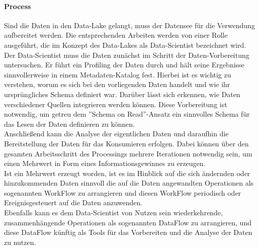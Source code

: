 \documentclass[twoside,twocolumn]{article}
\begin{document}
\paragraph{Process}
		Sind die Daten in den Data-Lake gelangt, muss der Datensee für die Verwendung aufbereitet werden. Die entsprechenden Arbeiten werden von einer Rolle ausgeführt, die im Konzept des Data-Lakes als Data-Scientist bezeichnet wird.
		Der Data-Scientist muss die Daten zunächst im Schritt der Daten-Vorbereitung  untersuchen. Er führt ein Profiling der Daten durch und hält seine Ergebnisse sinnvollerweise in einem Metadaten-Katalog fest. Hierbei ist es wichtig zu verstehen, worum es sich bei den vorliegenden Daten handelt und wie ihr ursprüngliches Schema definiert  war. Darüber lässt sich erkennen, wie Daten verschiedener Quellen integrieren werden können. Diese Vorbereitung ist notwendig, um getreu dem ''Schema on Read''-Ansatz ein sinnvolles Schema für das Lesen der Daten definieren zu können.\\
		Anschließend kann die Analyse der eigentlichen Daten und daraufhin die Bereitstellung der Daten für das Konsumieren erfolgen. Dabei können über den gesamten Arbeitsschritt des Processings mehrere Iterationen notwendig sein, um einen Mehrwert in Form eines Informationsgewinnes zu erzeugen.\\
		Ist ein Mehrwert erzeugt worden, ist es im Hinblick auf die sich ändernden oder hinzukommenden Daten sinnvoll die auf die Daten angewandten Operationen als sogenannten WorkFlow zu arrangieren und diesen WorkFlow periodisch oder Ereignisgesteuert auf die Daten anzuwenden.\\
		Ebenfalls kann es dem Data-Scientist von Nutzen sein wiederkehrende, zusammenhängende Operationen als sogenannten DataFlow zu arrangieren, und diese DataFlow künftig als Tools für das Vorbereiten und die Analyse der Daten zu nutzen.\\
		\cite{src8}\cite{src12}
		
\end{document}
